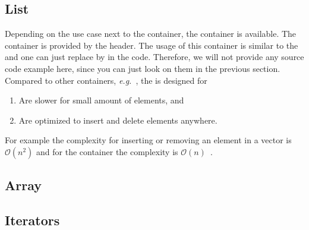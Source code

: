 \subsection{List}
Depending on the use case next to the  container, the  container is available. The  container is provided by the  header. The usage of this container is similar to the  and one can just replace  by  in the code. Therefore, we will not provide any source code example here, since you can just look on them in the previous section. Compared to other containers, \emph{e.g.}\ , the  is designed for
\begin{enumerate}
\item Are slower for small amount of elements, and
\item Are optimized to insert and delete elements anywhere.
\end{enumerate}
For example the complexity for inserting or removing an element in a vector is $\mathcal{O}(n^2)$ and for the container  the complexity is $\mathcal{O}(n)$~\cite{michalewicz2013genetic,knuth1997art}.

\subsection{Array}


\subsection{Iterators}
\label{ref:stl:iterators}


